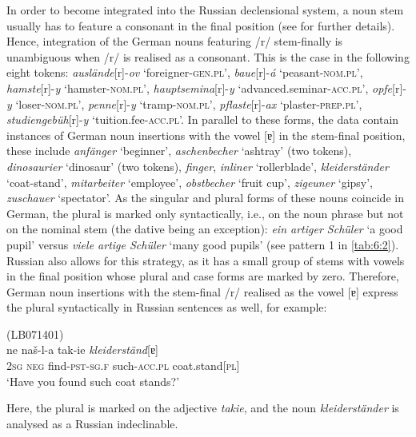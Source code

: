 \begin{sloppypar}
In order to become integrated into the Russian declensional system, a noun stem usually has to feature a consonant in the final position (see  for further details). Hence, integration of the German nouns featuring /r/ stem-finally is unambiguous when /r/ is realised as a consonant. This is the case in the following eight tokens: \textit{auslände}[r]-\textit{ov} `foreigner-\textsc{gen.pl}', \textit{baue}[r]-\textit{á} `peasant-\textsc{nom.pl}', \textit{hamste}[r]-\textit{y} `hamster-\textsc{nom.pl}', \textit{hauptsemina}[r]-\textit{y}  ‘advanced.seminar-\textsc{acc}.\textsc{pl}’, \textit{opfe}[r]-\textit{y} `loser-\textsc{nom.pl}', \textit{penne}[r]-\textit{y} `tramp-\textsc{nom.pl}', \textit{pflaste}[r]-\textit{ax} `plaster-\textsc{prep.pl}', \textit{studiengebüh}[r]-\textit{y} `tuition.fee-\textsc{acc.pl}'. In parallel to these forms, the data contain instances of German noun insertions with the vowel [ɐ] in the stem-final position, these include \textit{anfänger} `beginner', \textit{aschenbecher} `ashtray' (two tokens), \textit{dinosaurier} `dinosaur' (two tokens), \textit{finger}, \textit{inliner} `rollerblade',  \textit{kleiderständer} `coat-stand', \textit{mitarbeiter} `employee', \textit{obstbecher} `fruit cup', \textit{zigeuner} `gipsy', \textit{zuschauer} `spectator'. As the singular and plural forms of these nouns coincide in German, the plural is marked only syntactically, i.e., on the noun phrase but not on the nominal stem (the dative being an exception): \textit{ein artiger Schüler} `a good pupil' versus \textit{viele artige Schüler} `many good pupils' (see pattern 1 in \ref{tab:6:2}). Russian also allows for this strategy, as it has a small group of stems with vowels in the final position whose plural and case forms are marked by zero. Therefore, German noun insertions with the stem-final /r/ realised as the vowel [ɐ] express the plural syntactically in Russian sentences as well, for example:
\end{sloppypar}\largerpage

\ea
\label{ex:6:16}
(LB071401)\\
 {ne} {naš-l-a} {tak-ie} \textit{kleiderständ}[ɐ]\\
	\textsc{2sg} \textsc{neg} find-\textsc{pst-sg.f} such-\textsc{acc.pl} coat.stand[\textsc{pl}]\\
\glt `Have you found such coat stands?'
\z

\noindent Here, the plural is marked on the adjective \textit{takie}, and the noun \textit{kleiderständer} is analysed as a Russian indeclinable. 

